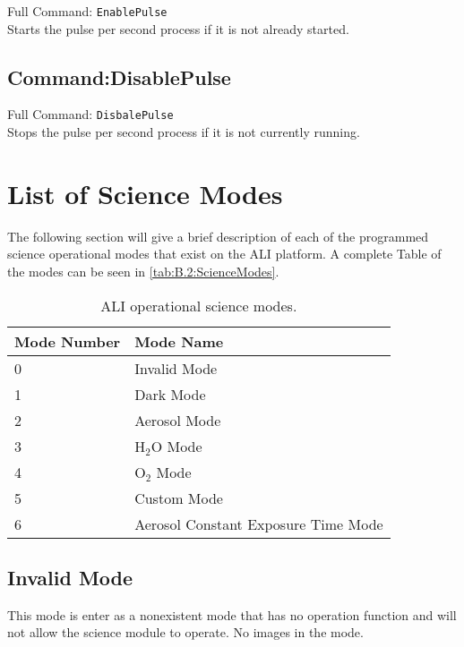 Full Command: \texttt{EnablePulse}\\

Starts the pulse per second process if it is not already started.

\subsection{Command:DisablePulse}

Full Command: \texttt{DisbalePulse}\\

Stops the pulse per second process if it is not currently running.

\section{List of Science Modes}
\label{sec:B.2:ScienceModes}

The following section will give a brief description of each of the programmed science operational modes that exist on the ALI platform. A complete Table of the modes can be seen in \autoref{tab:B.2:ScienceModes}.

\begin{table}
    \begin{center}
    \begin{tabular}{|l|l|}
    \hline
    Mode Number & Mode Name \\
    \hline
    0 & Invalid Mode \\
    \hline
    1 & Dark Mode \\
    \hline
    2 & Aerosol Mode \\
    \hline
    3 & H$_{2}$O Mode \\
    \hline
    4 & O$_{2}$ Mode \\
    \hline
    5 & Custom Mode \\
    \hline
    6 & Aerosol Constant Exposure Time Mode \\
    \hline
    \end{tabular}
    \end{center}
    \caption[ALI Operational Science Modes]{ALI operational science modes.}
    \label{tab:B.2:ScienceModes}
\end{table}

\subsection{Invalid Mode}

This mode is enter as a nonexistent mode that has no operation function and will not allow the science module to operate. No images in the mode.

